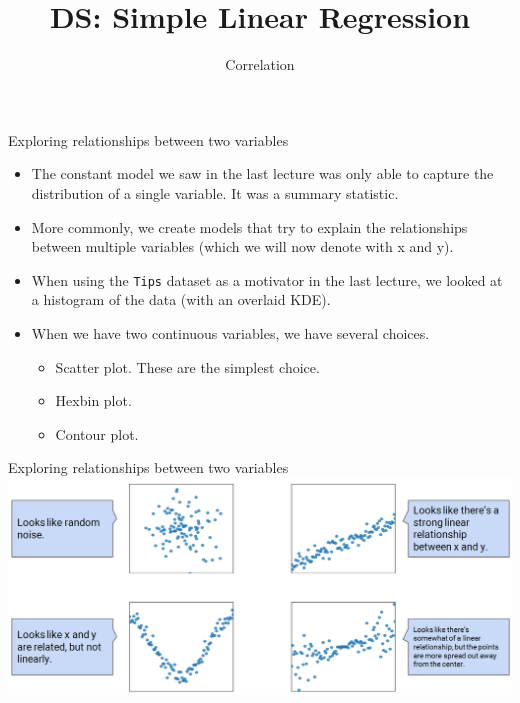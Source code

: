 \documentclass[aspectratio=169]{../latex_main/tntbeamer}  %
\title[Regression]{DS: Simple Linear Regression}
\subtitle{Correlation}
\begin{document}
	
	\maketitle
	\begin{frame}{Exploring relationships between two variables}
	    \begin{itemize}
	        \item The constant model we saw in the last lecture was only able to capture the distribution of a single variable. It was a summary statistic.
	        \item More commonly, we create models that try to explain the relationships between multiple variables (which we will now denote with x and y).
	        \item When using the \texttt{Tips} dataset as a motivator in the last lecture, we looked at a histogram of the data (with an overlaid KDE).
	        \item When we have two continuous variables, we have several choices.
	        \begin{itemize}
	            \item Scatter plot. These are the simplest choice.
	            \item Hexbin plot.
	            \item Contour plot.
	        \end{itemize}
	    \end{itemize}
	\end{frame}
	
	
	\begin{frame}{Exploring relationships between two variables}
	    \includegraphics[scale=.4]{Bild1}
	\end{frame}
	
	
	
\end{document}
